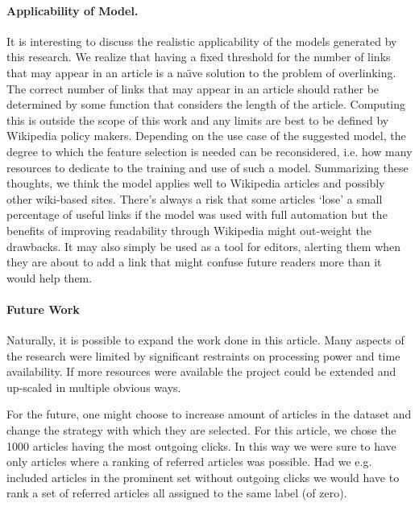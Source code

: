 \paragraph{Applicability of Model. }
It is interesting to discuss the realistic applicability of the models generated by this research. We realize that having a fixed threshold for the number of links that may appear in an article is a na\"{\i}ve solution to the problem of overlinking. The correct number of links that may appear in an article should rather be determined by some function that considers the length of the article. Computing this is outside the scope of this work and any limits are best to be defined by Wikipedia policy makers. Depending on the use case of the suggested model, the degree to which the feature selection is needed can be reconsidered, i.e. how many resources to dedicate to the training and use of such a model.
Summarizing these thoughts, we think the model applies well to Wikipedia articles and possibly other wiki-based sites. There's always a risk that some articles `lose' a small percentage of useful links if the model was used with full automation but the benefits of improving readability through Wikipedia might out-weight the drawbacks. It may also simply be used as a tool for editors, alerting them when they are about to add a link that might confuse future readers more than it would help them.

\paragraph{Future Work}
Naturally, it is possible to expand the work done in this article. Many aspects of the research were limited by significant restraints on processing power and time availability. If more resources were available the project could be extended and up-scaled in multiple obvious ways.%

For the future, one might choose to increase amount of articles in the dataset and change the strategy with which they are selected.  For this article, we chose the 1000 articles having the most outgoing clicks. In this way we were sure to have only articles where a ranking of referred articles was possible. Had we e.g. included articles in the prominent set without outgoing clicks we would have to rank a set of referred articles all assigned to the same label (of zero). %

